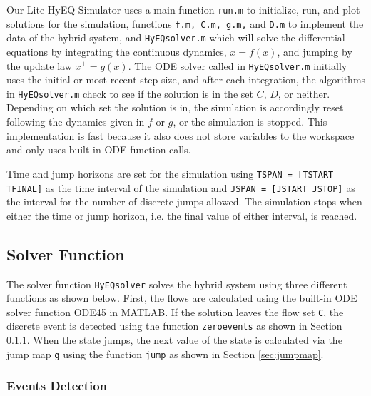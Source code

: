 \documentclass{article}
\newcommand{\ricardo}[1]{{\color{blue} #1}}
\begin{document}
Our Lite HyEQ Simulator uses a main function {\tt run.m} to initialize, run, and plot solutions for the simulation, functions {\tt f.m, C.m, g.m,} and {\tt D.m} to implement the data of the hybrid system, and {\tt HyEQsolver.m} which will solve the differential equations by integrating the continuous dynamics, $\dot{x}=f(x)$, and jumping by the update law $x^+ = g(x)$. The ODE solver called in {\tt HyEQsolver.m} initially uses the initial or most recent step size, and after each integration, the algorithms in {\tt HyEQsolver.m} check to see if the solution is in the set $C$, $D$, or neither. Depending on which set the solution is in, the simulation is accordingly reset following the dynamics given in $f$ or $g$, or the simulation is stopped. This implementation is fast because it also does not store variables to the workspace and only uses built-in ODE function calls.

Time and jump horizons are set for the simulation using {\tt TSPAN = [TSTART TFINAL]} as the time interval of the simulation and {\tt JSPAN = [JSTART \hspace{2mm} JSTOP]} as the interval for the number of discrete jumps allowed. The simulation stops when either the time or jump horizon, i.e. the final value of either interval, is reached.



\subsection{Solver Function}


The solver function {\tt HyEQsolver} solves the hybrid system using three different functions as shown below. First, the flows are calculated using the built-in ODE solver function ODE45 in MATLAB. If the solution leaves the flow set {\tt C}, the discrete event is detected using the function {\tt zeroevents} as shown in Section \ref{sec:eventsdetection}. When the state jumps, the next value of the state is calculated via the jump map {\tt g} using the function {\tt jump} as shown in Section \ref{sec:jumpmap}.\\

\label{scr:HyEQsolver}

\subsubsection{Events Detection}
\label{sec:eventsdetection}
\end{document}
